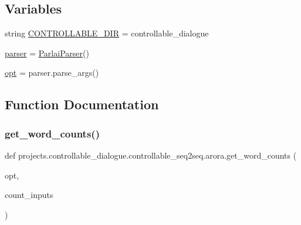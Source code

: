 \subsection*{Variables}
\begin{DoxyCompactItemize}
\item 
string \hyperlink{namespaceprojects_1_1controllable__dialogue_1_1controllable__seq2seq_1_1arora_a15100955b9f6d247b5870fa3a454907f}{C\+O\+N\+T\+R\+O\+L\+L\+A\+B\+L\+E\+\_\+\+D\+IR} = \textquotesingle{}controllable\+\_\+dialogue\textquotesingle{}
\item 
\hyperlink{namespaceprojects_1_1controllable__dialogue_1_1controllable__seq2seq_1_1arora_a59a3a3e672547353559a3eda4ba96870}{parser} = \hyperlink{classparlai_1_1core_1_1params_1_1ParlaiParser}{Parlai\+Parser}()
\item 
\hyperlink{namespaceprojects_1_1controllable__dialogue_1_1controllable__seq2seq_1_1arora_a2cdfcf7449581870a10f134649dd8d7f}{opt} = parser.\+parse\+\_\+args()
\end{DoxyCompactItemize}


\subsection{Function Documentation}
\mbox{\label{namespaceprojects_1_1controllable__dialogue_1_1controllable__seq2seq_1_1arora_a2a5256a5d5666134bc2a89b0fe831fcd}} 
\subsubsection{\texorpdfstring{get\+\_\+word\+\_\+counts()}{get\_word\_counts()}}
{\footnotesize\ttfamily def projects.\+controllable\+\_\+dialogue.\+controllable\+\_\+seq2seq.\+arora.\+get\+\_\+word\+\_\+counts (\begin{DoxyParamCaption}\item[{}]{opt,  }\item[{}]{count\+\_\+inputs }\end{DoxyParamCaption})}

